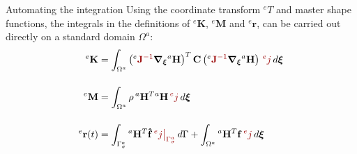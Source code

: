 \documentclass[aspectratio=169]{beamer}
\begin{document}
\begin{frame}{Automating the integration}
  Using the coordinate transform ${}^eT$ and master shape functions, the integrals in the definitions of ${}^e\mathbf K$, ${}^e\mathbf M$ and ${}^e\mathbf r$, can be carried out directly on a standard domain $\Omega^a$:
  \begin{align*}
    {}^e\mathbf K    & = \int_{\Omega^a}\left( {}^e{\color{darkred}\mathbf J^{-1}} \boldsymbol{\nabla}_{\boldxi}{}^a\mathbf H \right)^T\mathbf C\left( {}^e{\color{darkred}\mathbf J^{-1}}\boldsymbol{\nabla}_{\boldxi}{}^a\mathbf H \right) \, {\color{darkred}{}^ej} \, d\boldxi \\[12pt]
    {}^e\mathbf M    & =\int_{\Omega^a} \rho\, {}^a\mathbf H^T{}^a\mathbf H \, {\color{darkred}{}^ej} \, d\boldxi                                                                                                                                                                  \\[12pt]
    {}^e\mathbf r(t) & =\int_{\Gamma_\sigma^a} {}^a\mathbf H^{T}\mathbf{\hat f} \,{\color{darkred}{}^ej\big|_{\Gamma_\sigma^a}}\, d\Gamma+\int_{\Omega^a} {}^a\mathbf H^{T}\mathbf f\,{\color{darkred}{}^ej}\, d\boldxi
  \end{align*}
\end{frame}
\end{document}
